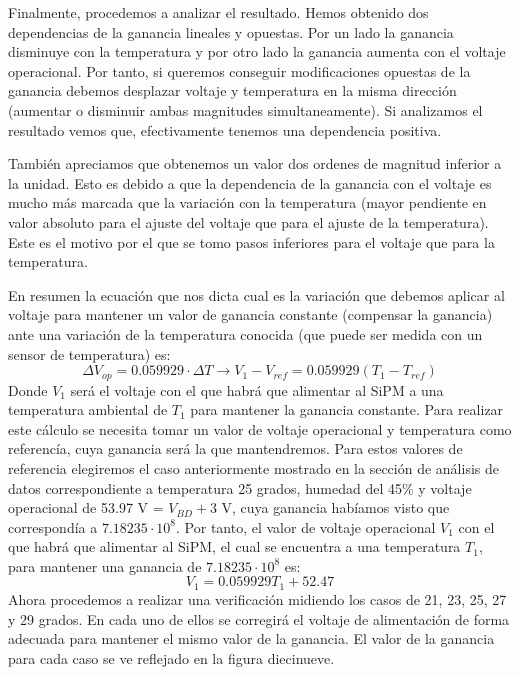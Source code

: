 Finalmente, procedemos a analizar el resultado. Hemos obtenido dos dependencias de la ganancia lineales y opuestas. Por un lado la ganancia disminuye con la temperatura y por otro lado la ganancia aumenta con el voltaje operacional. Por tanto, si queremos conseguir modificaciones opuestas de la ganancia debemos desplazar voltaje y temperatura en la misma dirección (aumentar o disminuir ambas magnitudes simultaneamente). Si analizamos el resultado vemos que, efectivamente tenemos una dependencia positiva.

También apreciamos que obtenemos un valor dos ordenes de magnitud inferior a la unidad. Esto es debido a que la dependencia de la ganancia con el voltaje es mucho más marcada que la variación con la temperatura (mayor pendiente en valor absoluto para el ajuste del voltaje que para el ajuste de la temperatura). Este es el motivo por el que se tomo pasos inferiores para el voltaje que para la temperatura. 

En resumen la ecuación que nos dicta cual es la variación que debemos aplicar al voltaje para mantener un valor de ganancia constante (compensar la ganancia) ante una variación de la temperatura conocida (que puede ser medida con un sensor de temperatura) es:
\begin{equation}
\Delta V_{op}=0.059929 \cdot \Delta T \longrightarrow V_1-V_{ref}=0.059929(T_1-T_{ref})
\label{compensacionfinal}
\end{equation}
Donde $V_1$ será el voltaje con el que habrá que alimentar al SiPM a una temperatura ambiental de $T_1$ para mantener la ganancia constante. Para realizar este cálculo se necesita tomar un valor de voltaje operacional y temperatura como referencía, cuya ganancia será la que mantendremos. Para estos valores de referencia elegiremos el caso anteriormente mostrado en la sección de análisis de datos correspondiente a temperatura 25 grados, humedad del 45\% y voltaje operacional de 53.97 V = $V_{BD}+ 3$ V, cuya ganancia habíamos visto que correspondía a $7.18235 \cdot 10^8$. Por tanto, el valor de voltaje operacional $V_1$ con el que habrá que alimentar al SiPM, el cual se encuentra a una temperatura $T_1$, para mantener una ganancia de $7.18235 \cdot 10^8$ es:
\begin{equation}
V_1=0.059929T_1+52.47
\label{compensacionfinal}
\end{equation}
Ahora procedemos a realizar una verificación midiendo los casos de 21, 23, 25, 27 y 29 grados. En cada uno de ellos se corregirá el voltaje de alimentación de forma adecuada para mantener el mismo valor de la ganancia. El valor de la ganancia para cada caso se ve reflejado en la figura diecinueve. 

